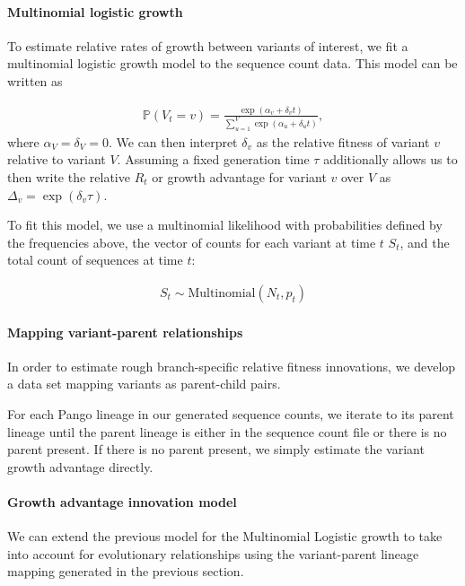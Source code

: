 \documentclass[12pt,oneside,letterpaper]{article}
\begin{document}
\paragraph{Multinomial logistic growth}

To estimate relative rates of growth between variants of interest, we fit a multinomial logistic growth model to the sequence count data.
This model can be written as

\begin{align*}
    \mathbb{P}(V_{t} = v) = \frac{\exp(\alpha_{v} + \delta_{v} t)}{\sum_{u=1}^{V} \exp(\alpha_{u} + \delta_{u} t)},
\end{align*}
where $\alpha_{V} = \delta_{V} = 0$.
We can then interpret $\delta_{v}$ as the relative fitness of variant $v$ relative to variant $V$.
Assuming a fixed generation time $\tau$ additionally allows us to then write the relative $R_{t}$ or growth advantage for variant $v$ over $V$ as $\Delta_{v} = \exp(\delta_{v}\tau)$.

To fit this model, we use a multinomial likelihood with probabilities defined by the frequencies above, the vector of counts for each variant at time $t$ $S_{t}$, and the total count of sequences at time $t$:

\begin{align*}
    S_{t} \sim \text{Multinomial}(N_{t}, p_{t})
\end{align*}

\paragraph{Mapping variant-parent relationships}%

In order to estimate rough branch-specific relative fitness innovations, we develop a data set mapping variants as parent-child pairs.

For each Pango lineage in our generated sequence counts, we iterate to its parent lineage until the parent lineage is either in the sequence count file or there is no parent present.
If there is no parent present, we simply estimate the variant growth advantage directly.

\paragraph{Growth advantage innovation model}%

We can extend the previous model for the Multinomial Logistic growth to take into account for evolutionary relationships using the variant-parent lineage mapping generated in the previous section.
\end{document}
